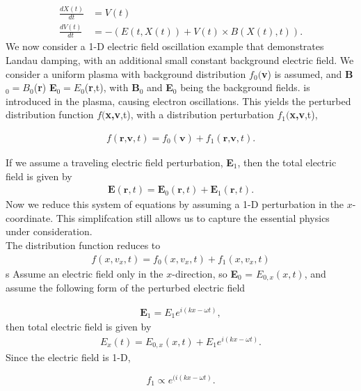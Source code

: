 \documentclass{article}
\begin{document}
\begin{align*}
\frac{d X(t)}{dt} &= V(t)\\
\frac{d V(t)}{dt} & = -(E(t,X(t)) + V(t)\times B(X(t),t)).
\end{align*}
\vspace{0.01cm}
\noindent
We now consider a 1-D electric field oscillation example that demonstrates Landau damping, with an additional small constant background electric field. We consider a uniform plasma with background distribution $f_{0}($\textbf{v}) is assumed, and \textbf{B}$_0=B_0$(\textbf{r}) \textbf{E}$_0= E_0$(\textbf{r},t), with  \textbf{B}$_0$ and \textbf{E}$_0$ being the background fields. 
is introduced in the plasma, causing electron oscillations. This yields the perturbed distribution function $f($\textbf{x,v},t), with a distribution perturbation $f_1($\textbf{x,v},t), 

\begin{align*}
f(\textbf{r,v},t) = f_0(\textbf{v}) + f_1(\textbf{r,v},t).
\end{align*}

\noindent
If we assume a traveling electric field perturbation, \textbf{E}$_1$, then the total electric field is given by
\begin{align*}
\textbf{E}(\textbf{r},t) = \textbf{E}_0(\textbf{r},t) + \textbf{E}_{1}(\textbf{r},t).
\end{align*}
Now we reduce this system of equations by assuming a 1-D perturbation in the $x$-coordinate. This simplifcation still allows us to capture the essential physics under consideration.\\

The distribution function reduces to
\begin{align*}
f(x, v_x,t) = f_0(x,v_x,t) + f_1(x,v_x,t)
\end{align*}s
Assume an electric field only in the $x$-direction, so \textbf{E}$_0$ = $E_{0,x}(x,t)$, and assume the following form of the perturbed electric field

\begin{align*}
\textbf{E$_1$} = E_1e^{i(kx-\omega t)},
\end{align*}
then total electric field is given by 
\begin{align*}
E_x(t) = E_{0,x}(x,t) + E_1e^{i(kx-\omega t)}.
\end{align*}
Since the electric field is 1-D,

 $$f_1 \propto e^{(i(kx - \omega t)}.$$
\end{document}
